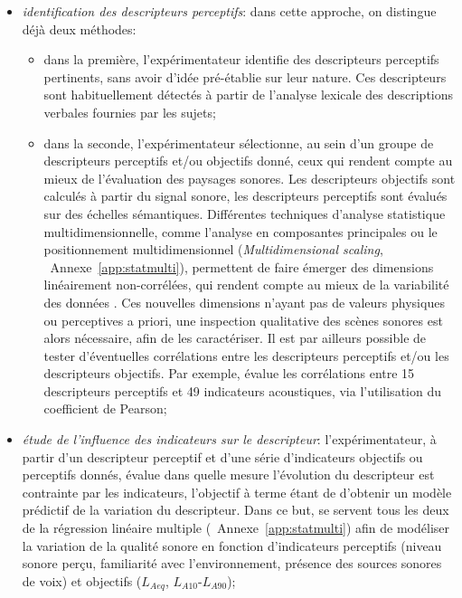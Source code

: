 \begin{itemize}

\item \emph{identification des descripteurs perceptifs}: dans cette approche, on distingue déjà deux méthodes:

\begin{itemize}
\item dans la première, l'expérimentateur identifie des descripteurs perceptifs pertinents, sans avoir d'idée pré-établie sur leur nature. Ces descripteurs sont habituellement détectés à partir de l'analyse lexicale des descriptions verbales fournies par les sujets;

\item dans la seconde, l'expérimentateur sélectionne, au sein d'un groupe de descripteurs perceptifs et/ou objectifs donné, ceux qui rendent compte au mieux de l'évaluation des paysages sonores. Les descripteurs objectifs sont calculés à partir du signal sonore, les descripteurs perceptifs sont évalués sur des échelles sémantiques. Différentes techniques d'analyse statistique multidimensionnelle, comme l'analyse en composantes principales ou le positionnement multidimensionnel (\emph{Multidimensional scaling}, \cf~Annexe~\ref{app:statmulti}), permettent de faire émerger des dimensions linéairement non-corrélées, qui rendent compte au mieux de la variabilité des données \citep{cain2013development,torija2013application}. Ces nouvelles dimensions n'ayant pas de valeurs physiques ou perceptives a priori, une inspection qualitative des scènes sonores est alors nécessaire, afin de les caractériser. Il est par ailleurs possible de tester d'éventuelles corrélations entre les descripteurs perceptifs et/ou les descripteurs objectifs. Par exemple, \citep{torija2013application} évalue les corrélations entre 15 descripteurs perceptifs et 49 indicateurs acoustiques, via l'utilisation du coefficient de Pearson;
\end{itemize}

\item \emph{étude de l'influence des indicateurs sur le descripteur}: l'expérimentateur, à partir d'un descripteur perceptif et d'une série d'indicateurs objectifs ou perceptifs donnés, évalue dans quelle mesure l'évolution du descripteur est contrainte par les indicateurs, l'objectif à terme étant de d'obtenir un modèle prédictif de la variation du descripteur. Dans ce but, \citep{lavandier2006contribution,ricciardi2015sound} se servent tous les deux de la régression linéaire multiple (\cf~Annexe~\ref{app:statmulti}) afin de modéliser la variation de la qualité sonore en fonction d'indicateurs perceptifs (niveau sonore perçu, familiarité avec l'environnement, présence des sources sonores de voix) et objectifs ($L_{Aeq}$, $L_{A10}$-$L_{A90}$);


\end{itemize}
